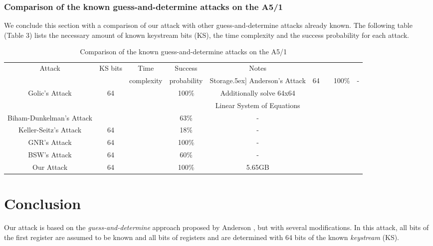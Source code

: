 \documentclass{llncs}
\begin{document}
\subsubsection{Comparison of the known guess-and-determine attacks on the A5/1}
We conclude this section with a comparison of our attack with other guess-and-determine attacks already known. The following table (Table 3) lists the necessary amount of known keystream bits (KS), the time complexity and the success probability for each attack.
\begin{table}[!htb]
\caption{Comparison of the known guess-and-determine attacks on the A5/1} \centering      \begin{tabular}{|c|c| c| c| c|}  \hline                        Attack & KS bits & Time  & Success & Notes \\&             &complexity &probability & Storage\0.5ex]
\hline                 Anderson's Attack\cite{[And]} & 64 &  & 100\% & - \\   Golic's Attack\cite{[Golic]} & 64 &  & 100\% & Additionally solve 64x64 \\ 
 & & & & Linear System of Equations\\
Biham-Dunkelman's Attack\cite{[BD]}&  &  & 63\% & -  \\ 
Keller-Seitz's Attack\cite{[KS01]} & 64 &  & 18\% & -\\ 
GNR's Attack\cite{[Rupp]} & 64 &  & 100\% & -\\
BSW's Attack\cite{[Bir]} & 64 &  & 60\% & - \\
Our Attack & 64 &  & 100\% & 5.65GB \\ [1ex]       \hline     \end{tabular} 
\label{table}  \end{table}
\section{Conclusion}
Our attack is based on the \emph{guess-and-determine} approach proposed by Anderson \cite{[And]}, but with several modifications. In this attack, all bits of the first register  are assumed to be known and all bits of registers  and  are determined with 64 bits of the known \emph{keystream} (KS).
\end{document}
